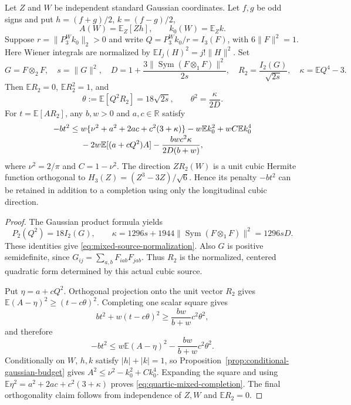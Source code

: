 \begin{proposition}
\label{prop:mixed-cubic-completion}
Let $Z$ and $W$ be independent standard Gaussian coordinates.  Let $f,g$
be odd signs and put $h=(f+g)/2$, $k=(f-g)/2$,
\[
 A(W)=\mathbb E_Z[Zh],\qquad k_0(W)=\mathbb E_Z k.
\]
Suppose $r=\|P_3^Wk_0\|_2>0$ and write
$Q=P_3^Wk_0/r=I_3(F)$, with $6\|F\|^2=1$.  Here Wiener integrals are
normalized by $\mathbb E I_j(H)^2=j!\|H\|^2$.
Set
\[
 G=F\otimes_2F,\quad s=\|G\|^2,\quad
 D=1+\frac{3\|\operatorname{Sym}(F\otimes_1F)\|^2}{2s},\quad
 R_2=\frac{I_2(G)}{\sqrt{2s}},\quad \kappa=\mathbb E Q^4-3.
\]
Then $\mathbb ER_2=0$, $\mathbb ER_2^2=1$, and
\begin{equation}\label{eq:mixed-source-normalization}
 \theta:=\mathbb E[Q^2R_2]=18\sqrt{2s},\qquad
 \theta^2=\frac{\kappa}{2D}.
\end{equation}
For $t=\mathbb E[AR_2]$, any $b,w>0$ and $a,c\in\mathbb R$ satisfy
\begin{align}
 -bt^2\leq{}&w\{\nu^2+a^2+2ac+c^2(3+\kappa)\}
 -w\mathbb E k_0^2+wC\mathbb E k_0^4
 \notag\\[-1mm]
 &-2w\mathbb E[(a+cQ^2)A]
 -\frac{bw c^2\kappa}{2D(b+w)},
 \label{eq:quartic-mixed-completion}
\end{align}
where $\nu^2=2/\pi$ and $C=1-\nu^2$.
The direction $ZR_2(W)$ is a unit cubic Hermite function orthogonal to
$H_3(Z)=(Z^3-3Z)/\sqrt6$.  Hence its penalty $-bt^2$ can be retained
in addition to a completion using only the longitudinal cubic direction.
\end{proposition}

\begin{proof}
The Gaussian product formula yields
\[
 P_2(Q^2)=18I_2(G),\qquad
 \kappa=1296s+1944\|\operatorname{Sym}(F\otimes_1F)\|^2=1296sD.
\]
These identities give \eqref{eq:mixed-source-normalization}.
Also $G$ is positive semidefinite, since
$G_{ij}=\sum_{a,b}F_{iab}F_{jab}$.  Thus $R_2$ is the normalized,
centered quadratic form determined by this actual cubic source.

Put $\eta=a+cQ^2$.  Orthogonal projection onto the unit vector $R_2$
gives $\mathbb E(A-\eta)^2\geq(t-c\theta)^2$.  Completing one scalar
square gives
\[
 bt^2+w(t-c\theta)^2\geq\frac{bw}{b+w}c^2\theta^2,
\]
and therefore
\[
 -bt^2\leq w\mathbb E(A-\eta)^2-
 \frac{bw}{b+w}c^2\theta^2.
\]
Conditionally on $W$, $h,k$ satisfy $|h|+|k|=1$, so
Proposition~\ref{prop:conditional-gaussian-budget} gives
$A^2\leq\nu^2-k_0^2+Ck_0^4$.  Expanding the square and using
$\mathbb E\eta^2=a^2+2ac+c^2(3+\kappa)$ proves
\eqref{eq:quartic-mixed-completion}.  The final orthogonality claim
follows from independence of $Z,W$ and $\mathbb ER_2=0$.
\end{proof}

